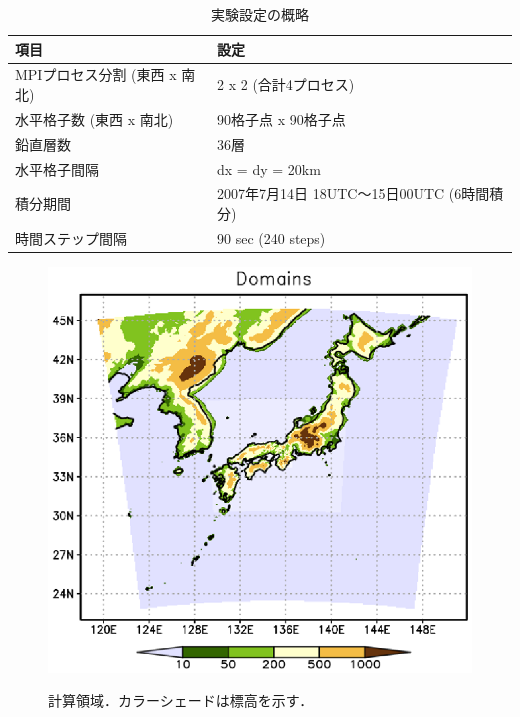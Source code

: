 \begin{table}[h]
\begin{center}
  \caption{実験設定の概略}
  \label{tab:grids}
  \begin{tabularx}{150mm}{|l|X|} \hline
    \rowcolor[gray]{0.9} 項目 & 設定 \\ \hline
    MPIプロセス分割 (東西 x 南北) & 2 x 2 (合計4プロセス) \\ \hline
    水平格子数 (東西 x 南北) & 90格子点 x 90格子点 \\ \hline
    鉛直層数                 & 36層                  \\ \hline
    水平格子間隔             & dx = dy = 20km       \\ \hline
    積分期間 & 2007年7月14日 18UTC～15日00UTC (6時間積分) \\ \hline
    時間ステップ間隔 & 90 sec (240 steps) \\ \hline
  \end{tabularx}
\end{center}
\end{table}

\begin{figure}[tb]
\begin{center}
  \includegraphics[width=0.5\hsize]{./figure/real_domain.eps}\\
  \caption{計算領域．カラーシェードは標高を示す．}
  \label{fig:tutrial_real_domain}
\end{center}
\end{figure}


